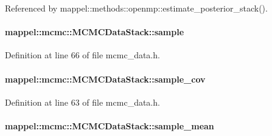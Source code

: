 Referenced by mappel\+::methods\+::openmp\+::estimate\+\_\+posterior\+\_\+stack().

\paragraph[{\texorpdfstring{sample}{sample}}]{ mappel\+::mcmc\+::\+M\+C\+M\+C\+Data\+Stack\+::sample}\hypertarget{structmappel_1_1mcmc_1_1MCMCDataStack_a3bac937763a2fa1a54378440b76c2531}{}\label{structmappel_1_1mcmc_1_1MCMCDataStack_a3bac937763a2fa1a54378440b76c2531}


Definition at line 66 of file mcmc\+\_\+data.\+h.

\paragraph[{\texorpdfstring{sample\+\_\+cov}{sample_cov}}]{ mappel\+::mcmc\+::\+M\+C\+M\+C\+Data\+Stack\+::sample\+\_\+cov}\hypertarget{structmappel_1_1mcmc_1_1MCMCDataStack_a4ef06af1c29a482bf5fdc8dc68e3e8b4}{}\label{structmappel_1_1mcmc_1_1MCMCDataStack_a4ef06af1c29a482bf5fdc8dc68e3e8b4}


Definition at line 63 of file mcmc\+\_\+data.\+h.

\paragraph[{\texorpdfstring{sample\+\_\+mean}{sample_mean}}]{ mappel\+::mcmc\+::\+M\+C\+M\+C\+Data\+Stack\+::sample\+\_\+mean}\hypertarget{structmappel_1_1mcmc_1_1MCMCDataStack_a2818767f68b1269c34bdd18c31122d24}{}\label{structmappel_1_1mcmc_1_1MCMCDataStack_a2818767f68b1269c34bdd18c31122d24}


